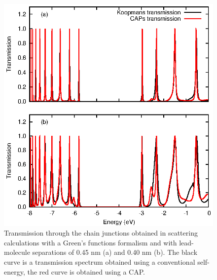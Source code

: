 \begin{figure} 
	\begin{center}
		\includegraphics[width=0.9\linewidth]{figures/figure2a_2b}
	\end{center}
	\caption{Transmission through the chain junctions obtained in
	         scattering calculations with a Green's functions formalism
		 and with lead-molecule separations of 0.45 nm (a) and 0.40
		 nm (b). The black curve is a transmission spectrum obtained
		 using a conventional self-energy, the red curve is
		 obtained using a \ac{CAP}.}
	\label{fig:transdat}
\end{figure}


